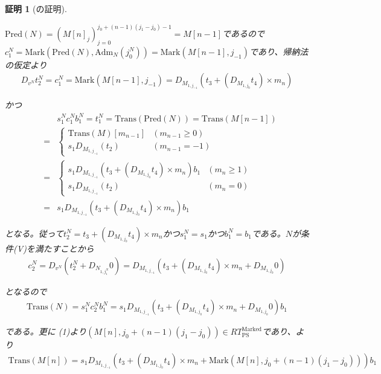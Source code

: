 \documentclass[dvipdfmx,uplatex]{jsarticle}
\theoremstyle{customnonumberbreakfortheorem}
\theoremstyle{customnonumberbreakforproof}
\newtheorem{hideableproof}{証明}
\begin{document}
\begin{hideableproof}[の証明]
\begin{indented}
\begin{indented}
			\item \(\textrm{Pred}(N) = (M[n]_j)_{j=0}^{j_0+(n-1)(j_1-j_0)-1} = M[n-1]\)であるので\(c_1^N = \textrm{Mark}(\textrm{Pred}(N),\textrm{Adm}_N(j_0^N)) = \textrm{Mark}(M[n-1],j_{-1})\)であり、帰納法の仮定より
			\begin{eqnarray*}
			D_{v^N} t_2^N = c_1^N = \textrm{Mark}(M[n-1],j_{-1}) = D_{M_{1,j_{-1}}}(t_3 + (D_{M_{1,j_0}} t_4) \times m_n)
			\end{eqnarray*}
			\item かつ
			\begin{eqnarray*}
			& & s_1^N c_1^N b_1^N = t_1^N = \textrm{Trans}(\textrm{Pred}(N)) = \textrm{Trans}(M[n-1]) \\
			& = & \left\{ \begin{array}{ll} \textrm{Trans}(M)[m_{n-1}] & (m_{n-1} \geq 0) \\ s_1 D_{M_{1,j_{-1}}}(t_2) & (m_{n-1} = -1) \end{array} \right. \\
			& = & \left\{ \begin{array}{ll} s_1 D_{M_{1,j_{-1}}} (t_3 + (D_{M_{1,j_0}} t_4) \times m_n) b_1 & (m_n \geq 1) \\ s_1 D_{M_{1,j_{-1}}}(t_2) & (m_n = 0) \end{array} \right. \\
			& = & s_1 D_{M_{1,j_{-1}}} (t_3 + (D_{M_{1,j_0}} t_4) \times m_n) b_1
			\end{eqnarray*}
			\item となる。従って\(t_2^N = t_3 + (D_{M_{1,j_0}} t_4) \times m_n\)かつ\(s_1^N = s_1\)かつ\(b_1^N = b_1\)である。\(N\)が条件(V)を満たすことから
			\begin{eqnarray*}
			c_2^N = D_{v^N}(t_2^N + D_{N_{1,j_1^N}} 0) = D_{M_{1,j_{-1}}}(t_3 + (D_{M_{1,j_0}} t_4) \times m_n + D_{M_{1,j_0}} 0)
			\end{eqnarray*}
			\item となるので
			\begin{eqnarray*}
			\textrm{Trans}(N) = s_1^N c_2^N b_1^N = s_1 D_{M_{1,j_{-1}}}(t_3 + (D_{M_{1,j_0}} t_4) \times m_n + D_{M_{1,j_0}} 0) b_1
			\end{eqnarray*}
			\item である。更に (1)より\((M[n],j_0+(n-1)(j_1-j_0)) \in RT_{\textrm{PS}}^{\textrm{Marked}}\)であり、より
			\begin{eqnarray*}
			\textrm{Trans}(M[n]) = s_1 D_{M_{1,j_{-1}}}(t_3 + (D_{M_{1,j_0}} t_4) \times m_n + \textrm{Mark}(M[n],j_0+(n-1)(j_1-j_0))) b_1

\end{eqnarray*}
\end{indented}
\end{indented}
\end{hideableproof}
\end{document}

